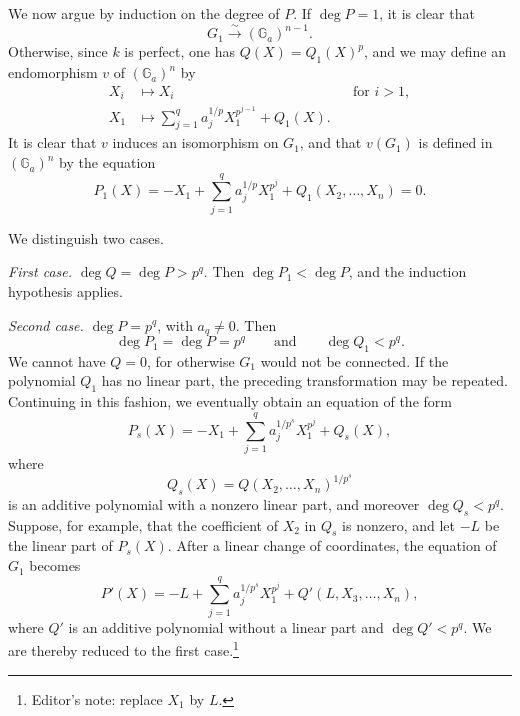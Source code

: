 We now argue by induction on the degree of \(P\).  If
\(\deg P=1\), it is clear that
\[
  G_1\xrightarrow{\ \sim\ }(\mathbb G_a)^{n-1}.
\]
Otherwise, since \(k\) is perfect, one has
\(Q(X)=Q_1(X)^p\), and we may define an endomorphism \(v\) of
\((\mathbb G_a)^n\) by
\[
\begin{aligned}
  X_i&\longmapsto X_i &&\text{for \(i>1\)},\\
  X_1&\longmapsto
    \sum_{j=1}^{q}a_j^{1/p}X_1^{p^{j-1}}+Q_1(X).
\end{aligned}
\]
It is clear that \(v\) induces an isomorphism on \(G_1\), and that
\(v(G_1)\) is defined in \((\mathbb G_a)^n\) by the equation
\[
  \tag{\(*\)\(_1\)}
  P_1(X)=-X_1+\sum_{j=1}^{q}a_j^{1/p}X_1^{p^j}
    +Q_1(X_2,\ldots,X_n)=0.
\]



We distinguish two cases.

\medskip\noindent\textit{First case.}\quad
\(\deg Q=\deg P>p^q\).  Then \(\deg P_1<\deg P\), and the
induction hypothesis applies.

\medskip\noindent\textit{Second case.}\quad
\(\deg P=p^q\), with \(a_q\ne0\).  Then
\[
  \deg P_1=\deg P=p^q
  \qquad\text{and}\qquad
  \deg Q_1<p^q.
\]
We cannot have \(Q=0\), for otherwise \(G_1\) would not be
connected.  If the polynomial \(Q_1\) has no linear part, the
preceding transformation may be repeated.  Continuing in this
fashion, we eventually obtain an equation of the form
\[
  \tag{\(*\)\(_s\)}\label{sga3:xvii:lemma:4-1-5:equation:star-s}
  P_s(X)=-X_1+\sum_{j=1}^{q}a_j^{1/p^s}X_1^{p^j}+Q_s(X),
\]
where
\[
  Q_s(X)=Q(X_2,\ldots,X_n)^{1/p^s}
\]
is an additive polynomial with a nonzero linear part, and moreover
\(\deg Q_s<p^q\).  Suppose, for example, that the coefficient of
\(X_2\) in \(Q_s\) is nonzero, and let \(-L\) be the linear part
of \(P_s(X)\).  After a linear change of coordinates, the equation
of \(G_1\) becomes
\[
  P'(X)=-L+\sum_{j=1}^{q}a_j^{1/p^s}X_1^{p^j}
    +Q'(L,X_3,\ldots,X_n),
\]
where \(Q'\) is an additive polynomial without a linear part and
\(\deg Q'<p^q\).  We are thereby reduced to the first
case.\footnote[6]{Editor's note: replace \(X_1\) by \(L\).}



